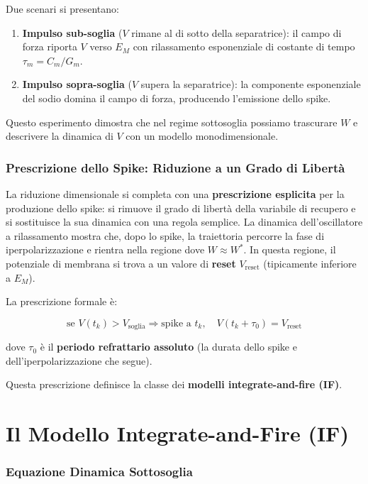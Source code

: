 Due scenari si presentano:
\begin{enumerate}
    \item \textbf{Impulso sub-soglia} ($V$ rimane al di sotto della separatrice): il campo di forza riporta $V$ verso $E_M$ con rilassamento esponenziale di costante di tempo $\tau_m = C_m/G_m$.
    \item \textbf{Impulso sopra-soglia} ($V$ supera la separatrice): la componente esponenziale del sodio domina il campo di forza, producendo l'emissione dello spike.
\end{enumerate}

Questo esperimento dimostra che nel regime sottosoglia possiamo trascurare $W$ e descrivere la dinamica di $V$ con un modello monodimensionale.

\subsubsection{Prescrizione dello Spike: Riduzione a un Grado di Libertà}

La riduzione dimensionale si completa con una \textbf{prescrizione esplicita} per la produzione dello spike: si rimuove il grado di libertà della variabile di recupero e si sostituisce la sua dinamica con una regola semplice. La dinamica dell'oscillatore a rilassamento mostra che, dopo lo spike, la traiettoria percorre la fase di iperpolarizzazione e rientra nella regione dove $W \approx W^*$. In questa regione, il potenziale di membrana si trova a un valore di \textbf{reset} $V_{\text{reset}}$ (tipicamente inferiore a $E_M$).

La prescrizione formale è:

\begin{equation}
\text{se } V(t_k) > V_{\text{soglia}} \Rightarrow \text{spike a } t_k, \quad V(t_k + \tau_0) = V_{\text{reset}}
\end{equation}

dove $\tau_0$ è il \textbf{periodo refrattario assoluto} (la durata dello spike e dell'iperpolarizzazione che segue).

Questa prescrizione definisce la classe dei \textbf{modelli integrate-and-fire (IF)}.

\section{Il Modello Integrate-and-Fire (IF)}

\subsubsection{Equazione Dinamica Sottosoglia}

